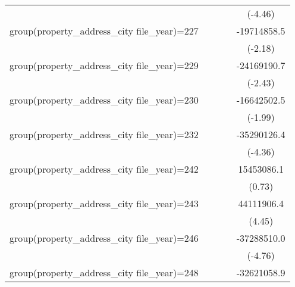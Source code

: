 {\begin{tabular}{l*{4}{c}}
                    &                     &                     &                     &     (-4.46)         \\
\addlinespace
group(property\_address\_city file\_year)=227&                     &                     &                     & -19714858.5\sym{*}  \\
                    &                     &                     &                     &     (-2.18)         \\
\addlinespace
group(property\_address\_city file\_year)=229&                     &                     &                     & -24169190.7\sym{*}  \\
                    &                     &                     &                     &     (-2.43)         \\
\addlinespace
group(property\_address\_city file\_year)=230&                     &                     &                     & -16642502.5\sym{*}  \\
                    &                     &                     &                     &     (-1.99)         \\
\addlinespace
group(property\_address\_city file\_year)=232&                     &                     &                     & -35290126.4\sym{***}\\
                    &                     &                     &                     &     (-4.36)         \\
\addlinespace
group(property\_address\_city file\_year)=242&                     &                     &                     &  15453086.1         \\
                    &                     &                     &                     &      (0.73)         \\
\addlinespace
group(property\_address\_city file\_year)=243&                     &                     &                     &  44111906.4\sym{***}\\
                    &                     &                     &                     &      (4.45)         \\
\addlinespace
group(property\_address\_city file\_year)=246&                     &                     &                     & -37288510.0\sym{***}\\
                    &                     &                     &                     &     (-4.76)         \\
\addlinespace
group(property\_address\_city file\_year)=248&                     &                     &                     & -32621058.9\sym{***}\\

\end{tabular}}

